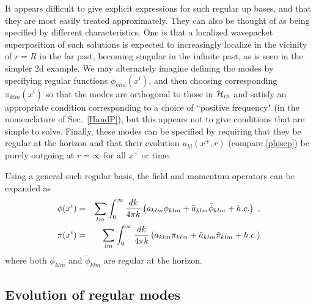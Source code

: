 \documentclass[11pt]{article}
\numberwithin{equation}{section}
\newcommand{\calh}{{\cal H}}
\newcommand{\bea}{\begin{eqnarray}}
\newcommand{\eea}{\end{eqnarray}}
\begin{document}
It appears difficult to give explicit expressions for such regular up bases, and that they are most easily treated approximately.  They can also be thought of as being specified by different characteristics.  One is that a localized wavepacket superposition of such solutions is expected to increasingly localize in the vicinity of $r=R$ in the far past, becoming singular in the infinite past, as is  seen in the simpler 2d example\cite{SE2d}.  
We may alternately imagine defining the modes by specifying regular functions $\phi_{klm}(x^i)$, and then choosing corresponding $\pi_{klm}(x^i)$ so that the modes are orthogonal to those in $\calh_{in}$ and satisfy an appropriate condition corresponding to a choice of ``positive frequency" (in the nomenclature of Sec.~\ref{HandP}), but this appears not to give conditions that are simple to solve.  Finally, these modes can be specified by requiring that they be regular at the horizon and that their evolution $u_{kl}(x^+,r)$ (compare \eqref{phisep}) be purely outgoing at $r=\infty$ for all $x^+$ or time.  


Using a general such regular basis, the field and momentum operators can be expanded as
\bea\label{Fexp}
\phi(x^i)&=&\sum_{lm} \int_0^{\infty}\frac{dk}{4\pi k} \left(a_{klm}\phi_{klm}+\tilde{a}_{klm}\tilde{\phi}_{klm}+h.c.\right)\ ,\cr
\pi(x^i)&=&\sum_{lm} \int_0^{\infty}\frac{dk}{4\pi k} \left(a_{klm}\pi_{klm}+\tilde{a}_{klm}\tilde{\pi}_{klm}+h.c.\right)
\eea 
where both $\phi_{klm}$ and $\tilde{\phi}_{klm}$ are regular at the horizon. 

\subsection{Evolution of regular modes}
\end{document}
